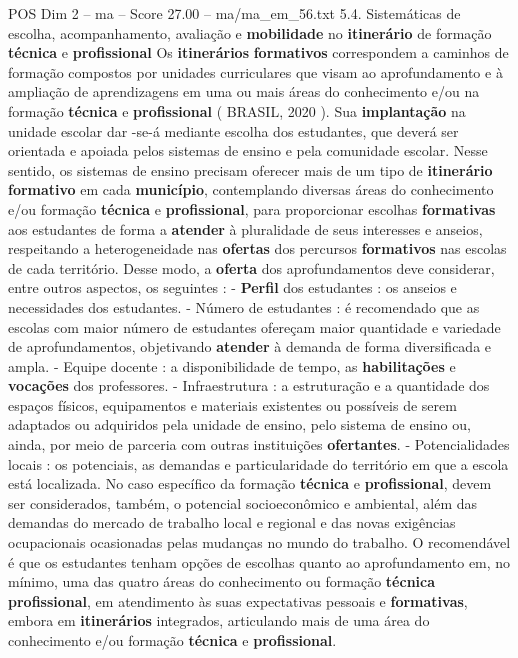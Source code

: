 \begin{textsample}{POS Dim 2 – ma – Score 27.00 – ma/ma\_em\_56.txt}  \label{ex:f2_pos_057}
5.4.
Sistemáticas de escolha, acompanhamento, avaliação e \textbf{mobilidade} no \textbf{itinerário} de formação \textbf{técnica} e \textbf{profissional} Os \textbf{itinerários} \textbf{formativos} correspondem a caminhos de formação compostos por unidades curriculares que visam ao aprofundamento e à ampliação de aprendizagens em uma ou mais áreas do conhecimento e/ou na formação \textbf{técnica} e \textbf{profissional} ( BRASIL, 2020 ).
Sua \textbf{implantação} na unidade escolar dar -se-á mediante escolha dos estudantes, que deverá ser orientada e apoiada pelos sistemas de ensino e pela comunidade escolar.
Nesse sentido, os sistemas de ensino precisam oferecer mais de um tipo de \textbf{itinerário} \textbf{formativo} em cada \textbf{município}, contemplando diversas áreas do conhecimento e/ou formação \textbf{técnica} e \textbf{profissional}, para proporcionar escolhas \textbf{formativas} aos estudantes de forma a \textbf{atender} à pluralidade de seus interesses e anseios, respeitando a heterogeneidade nas \textbf{ofertas} dos percursos \textbf{formativos} nas escolas de cada território.
Desse modo, a \textbf{oferta} dos aprofundamentos deve considerar, entre outros aspectos, os seguintes : - \textbf{Perfil} dos estudantes : os anseios e necessidades dos estudantes. - Número de estudantes : é recomendado que as escolas com maior número de estudantes ofereçam maior quantidade e variedade de aprofundamentos, objetivando \textbf{atender} à demanda de forma diversificada e ampla. - Equipe docente : a disponibilidade de tempo, as \textbf{habilitações} e \textbf{vocações} dos professores. - Infraestrutura : a estruturação e a quantidade dos espaços físicos, equipamentos e materiais existentes ou possíveis de serem adaptados ou adquiridos pela unidade de ensino, pelo sistema de ensino ou, ainda, por meio de parceria com outras instituições \textbf{ofertantes}. - Potencialidades locais : os potenciais, as demandas e particularidade do território em que a escola está localizada.
No caso específico da formação \textbf{técnica} e \textbf{profissional}, devem ser considerados, também, o potencial socioeconômico e ambiental, além das demandas do mercado de trabalho local e regional e das novas exigências ocupacionais ocasionadas pelas mudanças no mundo do trabalho.
O recomendável é que os estudantes tenham opções de escolhas quanto ao aprofundamento em, no mínimo, uma das quatro áreas do conhecimento ou formação \textbf{técnica} \textbf{profissional}, em atendimento às suas expectativas pessoais e \textbf{formativas}, embora em \textbf{itinerários} integrados, articulando mais de uma área do conhecimento e/ou formação \textbf{técnica} e \textbf{profissional}.

\end{textsample}
